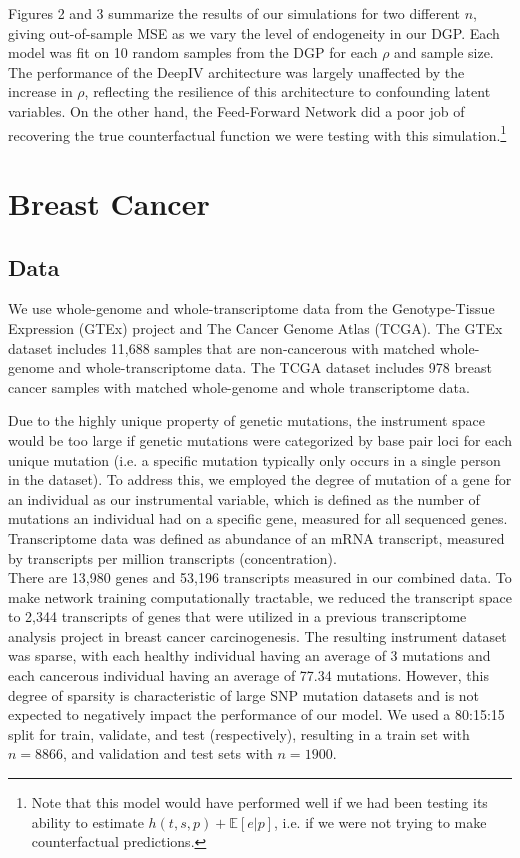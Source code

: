 \documentclass[10.5pt, oneside, twocolumn]{article}   	%
\begin{document}
Figures 2 and 3 summarize the results of our simulations for two different $n$, giving out-of-sample MSE as we vary the level of endogeneity in our DGP. Each model was fit on 10 random samples from the DGP for each $\rho$ and sample size. The performance of the DeepIV architecture was largely unaffected by the increase in $\rho$, reflecting the resilience of this architecture to confounding latent variables. On the other hand, the Feed-Forward Network did a poor job of recovering the true counterfactual function we were testing with this simulation.\footnote{Note that this model would have performed well if we had been testing its ability to estimate $h(t, s, p) + \mathbb{E}[e | p]$, i.e. if we were not trying to make counterfactual predictions.}

\section{Breast Cancer}

\subsection{Data}
We use whole-genome and whole-transcriptome data from the Genotype-Tissue Expression (GTEx) project \cite{gtex2015genotype} and The Cancer Genome Atlas (TCGA)\cite{tomczak2015cancer}. The GTEx dataset includes 11,688 samples that are non-cancerous with matched whole-genome and whole-transcriptome data. The TCGA dataset includes 978 breast cancer samples with matched whole-genome and whole transcriptome data. 

Due to the highly unique property of genetic mutations, the instrument space would be too large if genetic mutations were categorized by base pair loci for each unique mutation (i.e. a specific mutation typically only occurs in a single person in the dataset). To address this, we employed the degree of mutation of a gene for an individual as our instrumental variable, which is defined as the number of mutations an individual had on a specific gene, measured for all sequenced genes. Transcriptome data was defined as abundance of an mRNA transcript, measured by transcripts per million transcripts (concentration). \\

There are 13,980 genes and 53,196 transcripts measured in our combined data. To make network training computationally tractable, we reduced the transcript space to 2,344 transcripts of genes that were utilized in a previous transcriptome analysis project in breast cancer carcinogenesis. The resulting instrument dataset was sparse, with each healthy individual having an average of 3 mutations and each cancerous individual having an average of 77.34 mutations. However, this degree of sparsity is characteristic of large SNP mutation datasets and is not expected to negatively impact the performance of our model. We used a 80:15:15 split for train, validate, and test (respectively), resulting in a train set with $n = 8866$, and validation and test sets with $n = 1900$.
\end{document}
